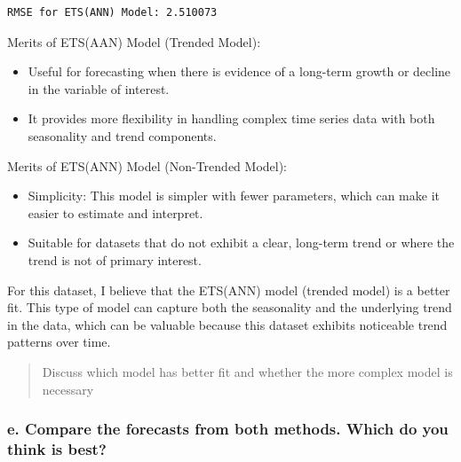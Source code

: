\documentclass[
]{article}
\begin{document}
\begin{verbatim}
RMSE for ETS(ANN) Model: 2.510073 
\end{verbatim}

Merits of ETS(AAN) Model (Trended Model):

\begin{itemize}
\item
  Useful for forecasting when there is evidence of a long-term growth or
  decline in the variable of interest.
\item
  It provides more flexibility in handling complex time series data with
  both seasonality and trend components.
\end{itemize}

Merits of ETS(ANN) Model (Non-Trended Model):

\begin{itemize}
\item
  Simplicity: This model is simpler with fewer parameters, which can
  make it easier to estimate and interpret.
\item
  Suitable for datasets that do not exhibit a clear, long-term trend or
  where the trend is not of primary interest.
\end{itemize}

For this dataset, I believe that the ETS(ANN) model (trended model) is a
better fit. This type of model can capture both the seasonality and the
underlying trend in the data, which can be valuable because this dataset
exhibits noticeable trend patterns over time.

\begin{quote}
Discuss which model has better fit and whether the more complex model is
necessary
\end{quote}

\hypertarget{e.-compare-the-forecasts-from-both-methods.-which-do-you-think-is-best}{%
\subsubsection{e. Compare the forecasts from both methods. Which do you
think is
best?}\label{e.-compare-the-forecasts-from-both-methods.-which-do-you-think-is-best}}
\end{document}
